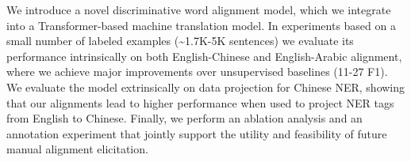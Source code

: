 We introduce a novel discriminative word alignment model, which we integrate into a Transformer-based machine translation model. In experiments based on
a small number of labeled examples ({\textasciitilde}1.7K-5K sentences) we evaluate its performance intrinsically on both English-Chinese and English-Arabic alignment,
where we achieve major improvements over unsupervised baselines (11-27 F1). We evaluate the model extrinsically on data projection for Chinese NER,
showing that our alignments lead to higher performance when used to project NER tags from English to Chinese. Finally, we perform an ablation analysis
and an annotation experiment that jointly support the utility and feasibility of future manual alignment elicitation.
